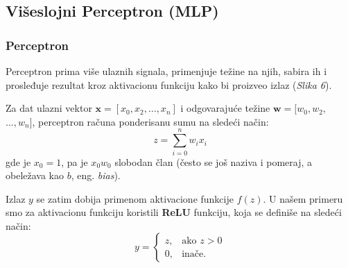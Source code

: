 \documentclass[12pt]{article}
\begin{document}
   \subsection*{Višeslojni Perceptron (MLP)}
   \subsubsection*{Perceptron}
    \vspace{-0.5cm}
   Perceptron prima više ulaznih signala, primenjuje težine na njih, 
   sabira ih i prosleđuje rezultat kroz aktivacionu funkciju kako bi proizveo izlaz (\textit{Slika 6}).
   
   Za dat ulazni vektor \(\mathbf{x} = [x_0, x_2, \ldots, x_n]\) i odgovarajuće težine 
   $\mathbf{w} = [w_0, w_2,$ $\ldots, w_n]$, perceptron računa ponderisanu sumu na sledeći način:
   \[
   z = \sum_{i=0}^{n} w_i x_i
   \]
   gde je \(x_0=1\), pa je $x_0w_0$ slobodan član (često se još naziva i pomeraj, a obeležava kao $b$, eng. \textit{bias}).
   
   Izlaz \(y\) se zatim dobija primenom aktivacione funkcije \(f(z)\). U našem primeru smo za
   aktivacionu funkciju koristili \textbf{ReLU} funkciju, koja se definiše na sledeći način:
   \[
      y = 
      \begin{cases}
         z, & \text{ako } z > 0 \\
         0, & \text{inače}.
      \end{cases}
      \]
      
\end{document}
